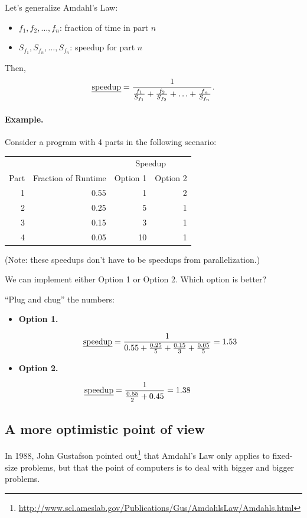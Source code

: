 Let's generalize Amdahl's Law:

\begin{itemize}
\item  $f_1, f_2, \ldots, f_n$: fraction of time in part $n$
\item  $S_{f_1}, S_{f_n}, \ldots, S_{f_n}$: speedup for part $n$
\end{itemize}

Then,
\[\mbox{\em speedup} = \frac{1}{\frac{f_1}{S_{f_1}} + \frac{f_2}{S_{f_2}} + \ldots +
     \frac{f_n}{S_{f_n}}}.\]

\paragraph{Example.} Consider a program with 4 parts in the following scenario:

\begin{center}
     \begin{tabular}{r|r|r|r}
     \multicolumn{2}{l}{} & \multicolumn{2}{|c}{Speedup} \\
     Part & Fraction of Runtime & Option 1 & Option 2\\
     \hline
     1 & 0.55 & 1  & 2\\
     2 & 0.25 & 5  & 1\\
     3 & 0.15 & 3  & 1\\
     4 & 0.05  & 10 & 1\\
     \end{tabular}
 \end{center}

     (Note: these speedups don't have to be speedups from parallelization.)
    
   We can implement either Option 1 or Option 2. 
   Which option is better?

   ``Plug and chug'' the numbers:
 \begin{itemize}
 \item  {\bf Option 1.}

   \[ \mbox{\em speedup} = \frac{1}{0.55 + \frac{0.25}{5} + \frac{0.15}{3} + \frac{0.05}{5}}
     = 1.53 \]

 \item  {\bf Option 2.}

   \[\mbox{\em speedup} = \frac{1}{\frac{0.55}{2} + 0.45} = 1.38 \hspace*{5.5em}\]
\end{itemize}

\subsection*{A more optimistic point of view}
In 1988, John Gustafson pointed
out\footnote{\url{http://www.scl.ameslab.gov/Publications/Gus/AmdahlsLaw/Amdahls.html}}
that Amdahl's Law only applies to fixed-size problems, but that the
point of computers is to deal with bigger and bigger problems.

